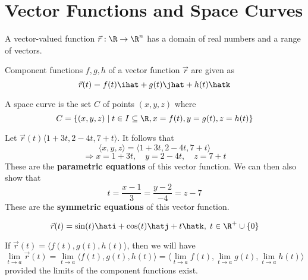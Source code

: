 \section{Vector Functions and Space Curves}
\begin{definition}
    A vector-valued function \(\vec{r}:\R\to\R^n\) has a domain of real numbers and a range of vectors.
\end{definition}
\begin{definition}
    Component functions \(f,g,h\) of a vector function \(\vec{r}\) are given as
    \[
        \vec{r}(t)=f(t)\ihat+g(t)\jhat+h(t)\hatk
    \]
\end{definition}
\begin{definition}
    A space curve is the set \(C\) of points \((x,y,z)\) where
    \[
        C=\{(x,y,z)\mid t\in I \subseteq \R,x=f(t),y=g(t),z=h(t)\}
    \]
\end{definition}
Let \(\vec{r}(t)\langle 1+3t,2-4t,7+t \rangle\). It follows that
\[
    \langle x,y,z \rangle = \langle 1+3t,2-4t,7+t \rangle 
\]
\[
    \Rightarrow x=1+3t,\quad y=2-4t,\quad z=7+t
\]
These are the \textbf{parametric equations} of this vector function. We can then also show that
\[
    t=\frac{x-1}{3}=\frac{y-2}{-4}=z-7
\]
These are the \textbf{symmetric equations} of this vector function.
\begin{center}
    \[
        \vec{r}(t)=\sin(t)\hati+\cos(t)\hatj+t\hatk,\; t\in\R^+\cup\{0\}
    \]
\end{center}
\begin{definition}
    If \(\vec{r}(t)= \langle f(t),g(t),h(t) \rangle \), then we will have
    \[
        \lim_{t\to a}\vec{r}(t)=\lim_{t\to a}\langle f(t),g(t),h(t) \rangle  = \langle \lim_{t\to a}f(t),\lim_{t\to a}g(t),\lim_{t\to a}h(t)    \rangle 
    \]
    provided the limits of the component functions exist.
\end{definition}